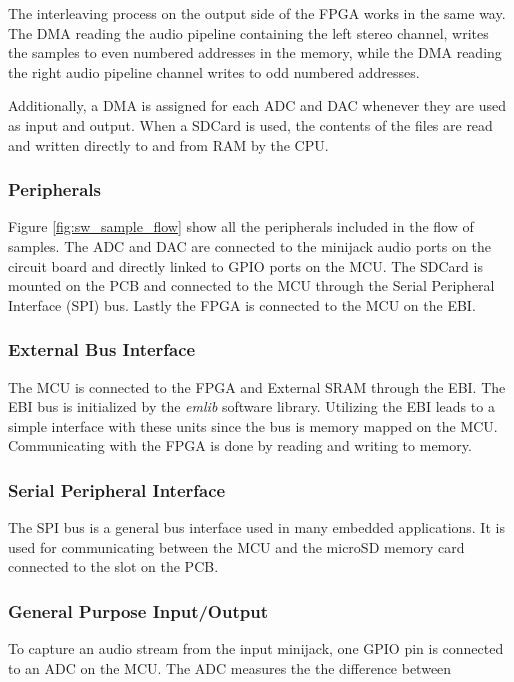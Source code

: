 The interleaving process on the output side of the FPGA works in the same way.
The DMA reading the audio pipeline containing the left stereo channel, writes
the samples to even numbered addresses in the memory, while the DMA reading the
right audio pipeline channel writes to odd numbered addresses.

Additionally, a DMA is assigned for each ADC and DAC whenever they are used as
input and output. When a SDCard is used, the contents of the files are read and
written directly to and from RAM by the CPU.

\subsubsection{Peripherals}



Figure \ref{fig:sw_sample_flow} show all the peripherals included in the flow of samples.
The ADC and DAC are connected to the minijack audio ports on the circuit board and directly
linked to GPIO ports on the MCU. The SDCard
is mounted on the PCB and connected to the MCU through the Serial Peripheral Interface (SPI)
bus. Lastly the FPGA is connected to the MCU on the EBI.

\subsubsection{External Bus Interface}
The MCU is connected to the FPGA and External SRAM through the EBI. The EBI bus
is initialized by the {\it emlib} software library. Utilizing
the EBI leads to a simple interface with these units since the bus is memory
mapped on the MCU. Communicating with the FPGA is done by reading and writing to memory.

\subsubsection{Serial Peripheral Interface}
The SPI bus is a general bus interface used in many embedded applications. It is used
for communicating between the MCU and the microSD memory card connected to the slot
on the PCB.

\subsubsection{General Purpose Input/Output}
To capture an audio stream from the input minijack, one GPIO pin is connected to an
ADC on the MCU. The ADC measures the the difference between

